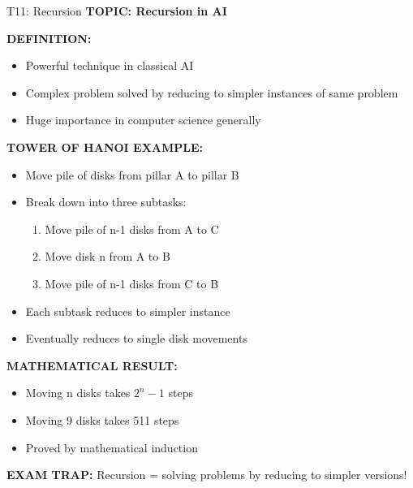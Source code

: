 \documentclass[8pt]{beamer}
\begin{document}
	\begin{frame}{T11: Recursion}
		\fontsize{6.5}{7.5}\selectfont
		\textbf{TOPIC: Recursion in AI}
		
		\vspace{0.1cm}
		\textbf{DEFINITION:}
		\begin{itemize}
			\item Powerful technique in classical AI
			\item Complex problem solved by reducing to simpler instances of same problem
			\item Huge importance in computer science generally
		\end{itemize}
		
		\vspace{0.1cm}
		\textbf{TOWER OF HANOI EXAMPLE:}
		\begin{itemize}
			\item Move pile of disks from pillar A to pillar B
			\item Break down into three subtasks:
			\begin{enumerate}
				\item Move pile of n-1 disks from A to C
				\item Move disk n from A to B
				\item Move pile of n-1 disks from C to B
			\end{enumerate}
			\item Each subtask reduces to simpler instance
			\item Eventually reduces to single disk movements
		\end{itemize}
		
		\vspace{0.1cm}
		\textbf{MATHEMATICAL RESULT:}
		\begin{itemize}
			\item Moving n disks takes $2^n - 1$ steps
			\item Moving 9 disks takes 511 steps
			\item Proved by mathematical induction
		\end{itemize}
		
		\textcolor{myred}{\textbf{EXAM TRAP:}} Recursion = \textcolor{myblue}{solving problems by reducing to simpler versions}!
	\end{frame}
	
\end{document}
